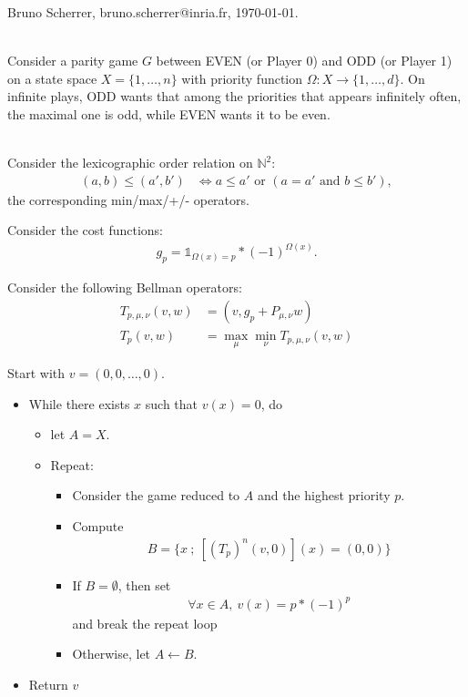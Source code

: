 \documentclass{article}
\def\1{{\mathds 1}}
\def\N{\mathbb N}
\begin{document}
\noindent Bruno Scherrer, bruno.scherrer@inria.fr, \today.

~\\

Consider a parity game $G$ between EVEN (or Player 0) and ODD (or Player 1) on a state space $X=\{1,\dots,n\}$ with priority function $\Omega:X \to \{1,\dots,d\}$. On infinite plays, ODD wants that among the priorities that appears infinitely often, the maximal one is odd, while EVEN wants it to be even.

~ \\

Consider the lexicographic order relation on $\N^2$:
\begin{align}
  (a,b) \le (a',b') & \Leftrightarrow a \le a' \mbox{ or }(a=a' \mbox{ and }b \le b' ),
\end{align}
the corresponding min/max/+/- operators.

Consider the cost functions:
\begin{align}
  g_p = \1_{\Omega(x)=p}*(-1)^{\Omega(x)}.
\end{align}

Consider the following Bellman operators:
\begin{align}
  T_{p,\mu,\nu} (v,w) &= (v, g_p + P_{\mu,\nu} w )\\
  T_{p}(v,w) &= \max_\mu \min_\nu T_{p,\mu,\nu}(v,w)
\end{align}

Start with $v=(0,0,\dots,0)$.
\begin{itemize}
\item While there exists $x$ such that $v(x)=0$, do
  \begin{itemize}
    \item let $A=X$.
    \item Repeat:
      \begin{itemize}
      \item Consider the game reduced to $A$ and the highest priority $p$.
      \item Compute
        \begin{align}
          B = \{x ~;~ [(T_p)^n(v,0)](x)=(0,0) \}
        \end{align}
      \item If $B=\emptyset$, then set
        \begin{align}
          \forall x \in A,~ v(x)=p*(-1)^p
        \end{align}
        and break the repeat loop
      \item Otherwise, let $A \leftarrow B$.
      \end{itemize}
  \end{itemize}
\item Return $v$
\end{itemize}
\end{document}
